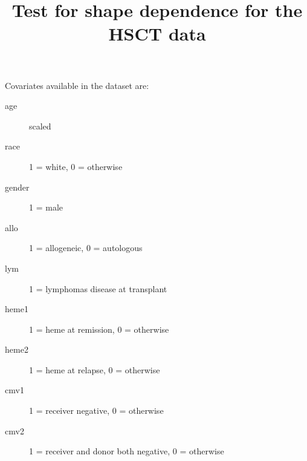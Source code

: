 \documentclass[a4paper,10pt]{article}
\title{Test for shape dependence for the HSCT data}
\author{}
\date{}
\begin{document}
\maketitle
\thispagestyle{empty} 
\pagestyle{empty}

\noindent

Covariates available in the dataset are:
\begin{description}
\item[age] scaled
\item[race] 1 = white, 0 = otherwise
\item[gender] 1 = male
\item[allo] 1 = allogeneic, 0 = autologous
\item[lym] 1 = lymphomas disease at transplant
\item[heme1] 1 = heme at remission, 0 = otherwise
\item[heme2] 1 = heme at relapse, 0 = otherwise
\item[cmv1] 1 = receiver negative, 0 = otherwise
\item[cmv2] 1 = receiver and donor both negative, 0 = otherwise
\end{description}
\end{document}
